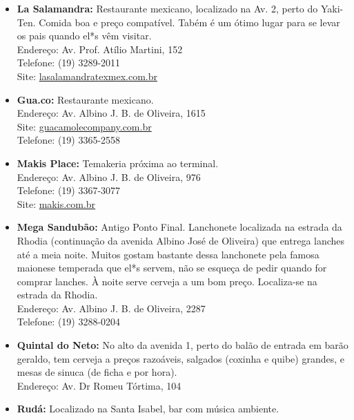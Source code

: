 \begin{itemize}
    \item   \textbf{La Salamandra:} Restaurante mexicano, localizado na Av. 2,
        perto do Yaki-Ten. Comida boa e preço compatível. Tabém é um ótimo lugar
        para se levar os pais quando el*s vêm visitar.
        \\Endereço: Av. Prof. Atílio Martini, 152
        \\Telefone: (19) 3289-2011
        \\Site: \url{lasalamandratexmex.com.br}

    \item   \textbf{Gua.co:} Restaurante mexicano.
        \\Endereço: Av. Albino J. B. de Oliveira, 1615
        \\Site: \url{guacamolecompany.com.br}
        \\Telefone: (19) 3365-2558

    \item   \textbf{Makis Place:} Temakeria próxima ao terminal.
        \\Endereço: Av. Albino J. B. de Oliveira, 976
        \\Telefone: (19) 3367-3077
        \\Site: \url{makis.com.br}

    \item   \textbf{Mega Sandubão:}
      Antigo Ponto Final. Lanchonete localizada na estrada da Rhodia
      (continuação da avenida Albino José de Oliveira) que entrega
      lanches até a meia noite. Muitos gostam bastante dessa
      lanchonete pela famosa maionese temperada que el*s servem, não
      se esqueça de pedir quando for comprar lanches. À noite serve
      cerveja a um bom preço. Localiza-se na estrada da Rhodia.
        \\Endereço: Av. Albino J. B. de Oliveira, 2287
        \\Telefone: (19) 3288-0204

    \item   \textbf{Quintal do Neto:} No alto da avenida 1, perto do balão de
        entrada em barão geraldo, tem cerveja a preços razoáveis, salgados
        (coxinha e quibe) grandes, e mesas de sinuca (de ficha e por hora).
        \\Endereço: Av. Dr Romeu Tórtima, 104

    \item   \textbf{Rudá:} Localizado na Santa Isabel, bar com música ambiente.


\end{itemize}
